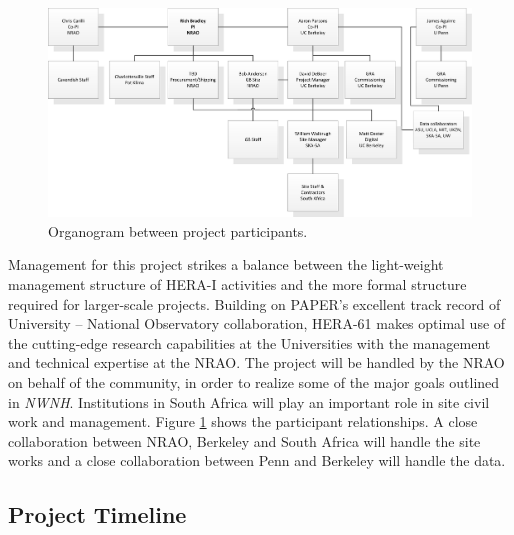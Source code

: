 \documentclass[preprint]{aastex}
\def\nwnh{{\sl NWNH}}
\begin{document}
\begin{figure}[ht]
\centering
\includegraphics[width=\textwidth]{plots/HERAorg.png}
\caption{Organogram between project participants.}
\label{fig:org}
\end{figure}

Management for this project strikes a balance between the light-weight management
structure of HERA-I activities and the more formal structure required
for larger-scale projects.  Building on PAPER's excellent track record
of University -- National Observatory collaboration, HERA-61 makes 
optimal use of the cutting-edge research capabilities at the Universities
with the management and technical expertise at the NRAO. The project will
be handled by the NRAO on behalf of the community, in order to realize
some of the major goals outlined in \nwnh. Institutions in
South Africa will play an important role in site civil work and management. 
Figure \ref{fig:org} shows the participant relationships.  A close collaboration
between NRAO, Berkeley and South Africa will handle the site works and
a close collaboration between Penn and Berkeley will handle the data.


\vspace{-0.25in}
\subsection{Project Timeline}
\vspace{-6pt}
\end{document}
